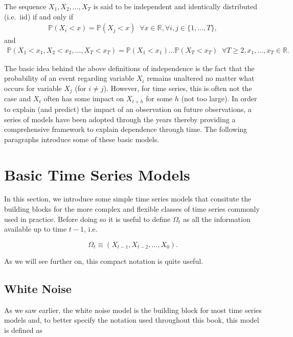 \documentclass[]{book}
\theoremstyle{definition}
\theoremstyle{definition}
\theoremstyle{definition}
\theoremstyle{remark}
\let\BeginKnitrBlock\begin \let\EndKnitrBlock\end
\begin{document}
\BeginKnitrBlock{definition}[iid sequence]
\protect\hypertarget{def:iid}{}{\label{def:iid} {} }The sequence \(X_{1},X_{2},\ldots,X_{T}\) is said to be
independent and identically distributed (i.e.~iid) if and only if
\begin{align*}
\mathbb{P}(X_{i}<x) = \mathbb{P}(X_{j}<x) \;\; \forall x \in \mathbb{R}, \forall i,j \in \{1,\ldots,T\},
\end{align*} and \begin{align*}
\mathbb{P}(X_{1}<x_{1},X_{2}<x_{2},\ldots,X_{T}<x_{T})=\mathbb{P}(X_{1}<x_1) \ldots \mathbb{P}(X_{T}<x_T) \;\; \forall T\geq2, x_1, \ldots, x_T \in \mathbb{R}.
\end{align*}
\EndKnitrBlock{definition}

The basic idea behind the above definitions of independence is the fact
that the probability of an event regarding variable \(X_i\) remains
unaltered no matter what occurs for variable \(X_j\) (for \(i \neq j\)).
However, for time series, this is often not the case and \(X_t\) often
has some impact on \(X_{t+h}\) for some \(h\) (not too large). In order
to explain (and predict) the impact of an observation on future
observations, a series of models have been adopted through the years
thereby providing a comprehensive framework to explain dependence
through time. The following paragraphs introduce some of these basic
models.

\hypertarget{basicmodels}{%
\section{Basic Time Series Models}\label{basicmodels}}

In this section, we introduce some simple time series models that
consitute the building blocks for the more complex and flexible classes
of time series commonly used in practice. Before doing so it is useful
to define \(\Omega_t\) as all the information available up to time
\(t-1\), i.e.

\[\Omega_t \equiv \left(X_{t-1}, X_{t-2}, ..., X_0 \right).\]

As we will see further on, this compact notation is quite useful.

\hypertarget{wn}{%
\subsection{White Noise}\label{wn}}

As we saw earlier, the white noise model is the building block for most
time series models and, to better specify the notation used throughout
this book, this model is defined as
\end{document}
